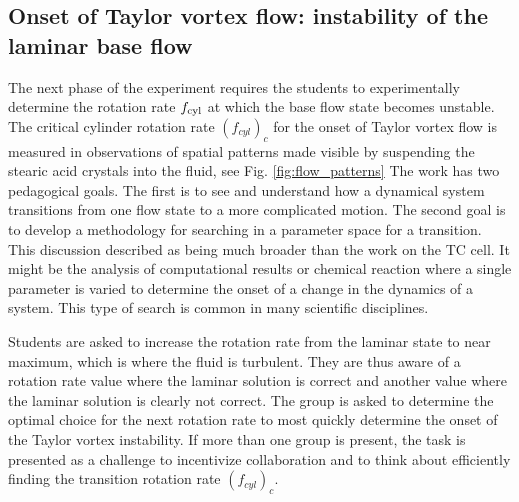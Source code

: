 \documentclass[%
 amsmath,amssymb,
 aps,
floatfix,
aps,prd,longbibliography,
notitlepage
]{revtex4-1}
\begin{document}
\subsection{Onset of Taylor vortex flow: instability of the laminar base flow}

The next phase of the experiment requires the students to experimentally determine the rotation rate $f_{\rm cyl}$ at which the base flow state becomes unstable. The critical cylinder rotation rate $(f_{cyl})_c$ for the onset of Taylor vortex flow is measured in observations of spatial patterns made visible by suspending the stearic acid crystals into the fluid, see Fig. \ref{fig:flow_patterns}  The work has two pedagogical goals. The first is to see and understand how a dynamical system transitions from one flow state to a more complicated motion. The second goal is to develop a methodology for searching in a parameter space for a transition. This discussion described as being much broader than the work on the TC cell. It might be the analysis of computational results or chemical reaction where a single parameter is varied to determine the onset of a change in the dynamics of a system. This type of search is common in many scientific disciplines. 

Students are asked to increase the rotation rate from the laminar state to near maximum, which is where the fluid is turbulent. They are thus aware of a rotation rate value where the laminar solution is correct and another value where the laminar solution is clearly not correct. The group is asked to determine the optimal choice for the next rotation rate to most quickly determine the onset of the Taylor vortex instability. If more than one group is present, the task is presented as a challenge to incentivize  collaboration and to think about efficiently finding the transition rotation rate $(f_{cyl})_c$.
\end{document}
